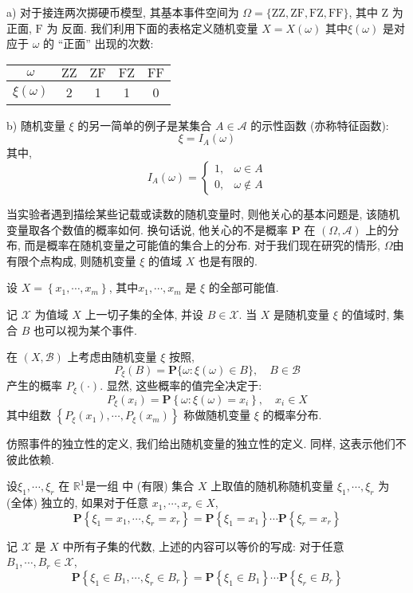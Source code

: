\begin{example}
    a) 对于接连两次掷硬币模型, 其基本事件空间为 $\Omega=\{\mathrm{ZZ}, \mathrm{ZF}, \mathrm{FZ}, \mathrm{FF}\}$, 其中 $\mathrm{Z}$ 为 正面, $\mathrm{F}$ 为 反面. 我们利用下面的表格定义随机变量 $X=X(\omega)$ 其中$\xi(\omega)$ 是对应于 $\omega$ 的 “正面” 出现的次数:
    \begin{tabular}{c|c|c|c|c}
        \hline$\omega$ & $\mathrm{ZZ}$ & $\mathrm{ZF}$ & $\mathrm{FZ}$ & $\mathrm{FF}$ \\
        \hline$\xi(\omega)$ & 2 & 1 & 1 & 0 \\
        \hline
        \end{tabular}

        b) 随机变量 $\xi$ 的另一简单的例子是某集合 $A \in \mathscr{A}$ 的示性函数 (亦称特征函数):
        $$
        \xi=I_A(\omega)
        $$其中, $$
        I_A(\omega)= \begin{cases}1, & \omega \in A \\ 0, & \omega \notin A\end{cases}
        $$
\end{example}

当实验者遇到描绘某些记载或读数的随机变量时, 则他关心的基本问题是, 该随机
变量取各个数值的概率如何. 换句话说, 他关心的不是概率 $\mathbf{P}$ 在 $(\Omega, \mathscr{A})$ 上的分布, 而是概率在随机变量之可能值的集合上的分布. 对于我们现在研究的情形, $\Omega$由有限个点构成, 则随机变量 $\xi$ 的值域 $X$ 也是有限的.

设 $X=\left\{x_1, \cdots, x_m\right\}$, 其中$x_1, \cdots, x_m$ 是 $\xi$ 的全部可能值.

记 $\mathscr{X}$ 为值域 $X$ 上一切子集的全体, 并设 $B \in \mathscr{X}$. 当 $X$ 是随机变量 $\xi$ 的值域时, 集合 $B$ 也可以视为某个事件.

在 $(X, \mathscr{B})$ 上考虑由随机变量 $\xi$ 按照,
$$
P_{\xi}(B)=\mathbf{P}\{\omega: \xi(\omega) \in B\}, \quad B \in \mathscr{B}
$$
产生的概率 $P_{\xi}(\cdot)$. 显然, 这些概率的值完全决定于:
$$
P_{\xi}\left(x_i\right)=\mathbf{P}\left\{\omega: \xi(\omega)=x_i\right\}, \quad x_i \in X
$$
其中组数 $\left\{P_{\xi}\left(x_1\right), \cdots, P_{\xi}\left(x_m\right)\right\}$ 称做随机变量 $\xi$ 的概率分布.

仿照事件的独立性的定义, 我们给出随机变量的独立性的定义. 同样, 这表示他们不彼此依赖. 

\begin{definition}
    设$\xi_1, \cdots, \xi_r$ 在 $\mathbb{R}^1$是一组  中 (有限) 集合 $X$ 上取值的随机称随机变量 $\xi_1, \cdots, \xi_r$ 为 (全体) 独立的, 如果对于任意 $x_1, \cdots, x_r \in X$,
$$
\mathbf{P}\left\{\xi_1=x_1, \cdots, \xi_r=x_r\right\}=\mathbf{P}\left\{\xi_1=x_1\right\} \cdots \mathbf{P}\left\{\xi_r=x_r\right\}
$$
\end{definition}

\begin{shaded}
    记 $\mathscr{X}$ 是 $X$ 中所有子集的代数, 上述的内容可以等价的写成: 对于任意 $B_1, \cdots, B_r \in \mathscr{X}$,
    $$
    \mathbf{P}\left\{\xi_1 \in B_1, \cdots, \xi_r \in B_r\right\}=\mathbf{P}\left\{\xi_1 \in B_1\right\} \cdots \mathbf{P}\left\{\xi_r \in B_r\right\}
    $$
\end{shaded}